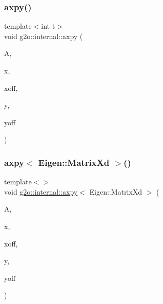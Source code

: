 \mbox{\label{namespaceg2o_1_1internal_a0656fb61cd6302ea0e3bf5f99890c05a}} 
\subsubsection{\texorpdfstring{axpy()}{axpy()}\hspace{0.1cm}{\footnotesize\ttfamily [2/2]}}
{\footnotesize\ttfamily template$<$int t$>$ \\
void g2o\+::internal\+::axpy (\begin{DoxyParamCaption}\item[{const Eigen\+::\+Matrix$<$ double, Eigen\+::\+Dynamic, t $>$ \&}]{A,  }\item[{const Eigen\+::\+Map$<$ const Eigen\+::\+Vector\+Xd $>$ \&}]{x,  }\item[{int}]{xoff,  }\item[{Eigen\+::\+Map$<$ Eigen\+::\+Vector\+Xd $>$ \&}]{y,  }\item[{int}]{yoff }\end{DoxyParamCaption})\hspace{0.3cm}{\ttfamily [inline]}}

\mbox{\label{namespaceg2o_1_1internal_abd59efa58c070f88c6890e10926d3410}} 
\subsubsection{\texorpdfstring{axpy$<$ Eigen\+::\+Matrix\+Xd $>$()}{axpy< Eigen::MatrixXd >()}}
{\footnotesize\ttfamily template$<$$>$ \\
void \mbox{\hyperlink{namespaceg2o_1_1internal_a3beb413c2d04c629c60a8ce5e05ddf8f}{g2o\+::internal\+::axpy}}$<$ Eigen\+::\+Matrix\+Xd $>$ (\begin{DoxyParamCaption}\item[{const Eigen\+::\+Matrix\+Xd \&}]{A,  }\item[{const Eigen\+::\+Map$<$ const Eigen\+::\+Vector\+Xd $>$ \&}]{x,  }\item[{int}]{xoff,  }\item[{Eigen\+::\+Map$<$ Eigen\+::\+Vector\+Xd $>$ \&}]{y,  }\item[{int}]{yoff }\end{DoxyParamCaption})\hspace{0.3cm}{\ttfamily [inline]}}

